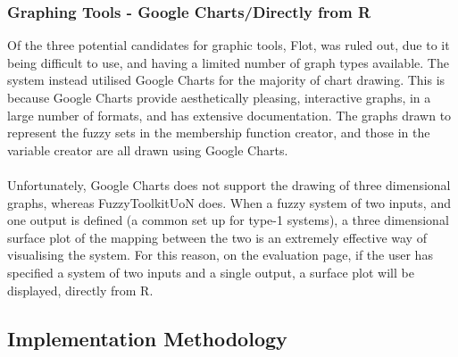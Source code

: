 \tocless\subsubsection{Graphing Tools - Google Charts/Directly from R}
Of the three potential candidates for graphic tools, Flot, was ruled out, due to it being difficult to use, and having a limited number of graph types available. The system instead utilised Google Charts for the majority of chart drawing. This is because Google Charts provide aesthetically pleasing, interactive graphs, in a large number of formats, and has extensive documentation. The graphs drawn to represent the fuzzy sets in the membership function creator, and those in the variable creator are all drawn using Google Charts.\ \\
\ \\
Unfortunately, Google Charts does not support the drawing of three dimensional graphs, whereas FuzzyToolkitUoN does. When a fuzzy system of two inputs, and one output is defined (a common set up for type-1 systems), a three dimensional surface plot of the mapping between the two is an extremely effective way of visualising the system. For this reason, on the evaluation page, if the user has specified a system of two inputs and a single output, a surface plot will be displayed, directly from R.

\subsection{Implementation Methodology}

